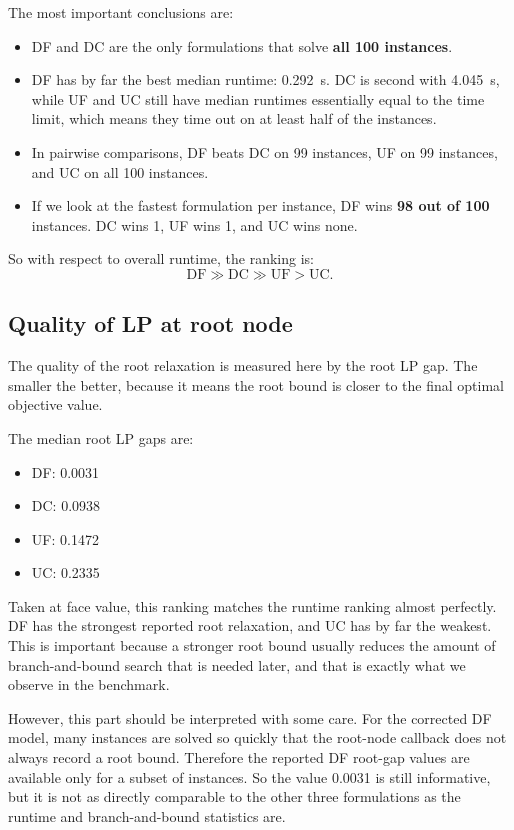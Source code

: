 The most important conclusions are:

\begin{itemize}
  \item DF and DC are the only formulations that solve \textbf{all 100 instances}.
  \item DF has by far the best median runtime: \SI{0.292}{s}. DC is second with
  \SI{4.045}{s}, while UF and UC still have median runtimes essentially equal
  to the time limit, which means they time out on at least half of the instances.
  \item In pairwise comparisons, DF beats DC on 99 instances, UF on 99 instances,
  and UC on all 100 instances.
  \item If we look at the fastest formulation per instance, DF wins
  \textbf{98 out of 100} instances. DC wins 1, UF wins 1, and UC wins none.
\end{itemize}

So with respect to overall runtime, the ranking is:
\[
\text{DF} \gg \text{DC} \gg \text{UF} > \text{UC}.
\]

\subsection{Quality of LP at root node}

The quality of the root relaxation is measured here by the root LP gap.
The smaller the better, because it means the root bound is closer to the final
optimal objective value.

The median root LP gaps are:

\begin{itemize}
  \item DF: 0.0031
  \item DC: 0.0938
  \item UF: 0.1472
  \item UC: 0.2335
\end{itemize}

Taken at face value, this ranking matches the runtime ranking almost perfectly.
DF has the strongest reported root relaxation, and UC has by far the weakest.
This is important because a
stronger root bound usually reduces the amount of branch-and-bound search that
is needed later, and that is exactly what we observe in the benchmark.

However, this part should be interpreted with some care. For the corrected DF
model, many instances are solved so quickly that the root-node callback does
not always record a root bound. Therefore the reported DF root-gap values are
available only for a subset of instances. So the value 0.0031 is still
informative, but it is not as directly comparable to the other three
formulations as the runtime and branch-and-bound statistics are.

